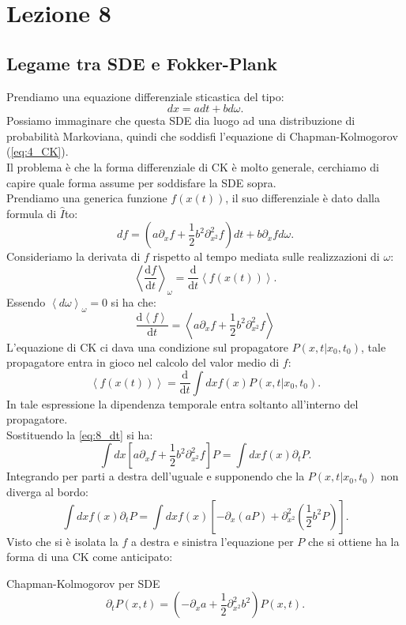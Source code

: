 \section{Lezione 8}%
\label{sub:Lezione 8}
\subsection{Legame tra SDE e Fokker-Plank}%
\label{sub:Legame tra SDE e Fokker-Plank}
Prendiamo una equazione differenziale sticastica del tipo:
\[
    dx = adt + bd\omega
.\] 
Possiamo immaginare che questa SDE dia luogo ad una distribuzione di probabilità Markoviana, quindi che soddisfi l'equazione di Chapman-Kolmogorov (\ref{eq:4_CK}). \\
Il problema è che la forma differenziale di CK è molto generale, cerchiamo di capire quale forma assume per soddisfare la SDE sopra.\\
Prendiamo una generica funzione $f(x(t))$, il suo differenziale è dato dalla formula di $\hat{I}$to:
\[
    df = \left(a\partial_{x}f + \frac{1}{2}b^2\partial^2_{x^2}f\right)dt + b \partial_{x}f d\omega
.\] 
Consideriamo la derivata di $f$ rispetto al tempo mediata sulle realizzazioni di $\omega$:
\[
    \left<\frac{\text{d} f}{\text{d} t} \right>_{\omega} = \frac{\text{d} }{\text{d} t} \left<f(x(t) )\right>
.\] 
Essendo $\left<d\omega\right>_{\omega}=0$ si ha che:
\begin{equation}
    \frac{\text{d} \left<f\right>}{\text{d} t} = \left<a \partial_{x}f +\frac{1}{2}b^2\partial^2_{x^2}f\right>
    \label{eq:8_dt}
\end{equation}
L'equazione di CK ci dava una condizione sul propagatore $P\left(x,t|x_0, t_0\right)$, tale propagatore entra in gioco nel calcolo del valor medio di $f$:
\[
    \left<f(x(t) ) \right> = \frac{\text{d} }{\text{d} t} \int  dx f(x) P\left(x,t|x_0, t_0\right)
.\] 
In tale espressione la dipendenza temporale entra soltanto all'interno del propagatore. \\
Sostituendo la \ref{eq:8_dt} si ha:
\[
    \int dx \left[a \partial_{x}f +\frac{1}{2}b^2\partial^2_{x^2}f\right]P = \int dx f(x) \partial_{t}P 
.\] 
Integrando per parti a destra dell'uguale e supponendo che la $P\left(x,t|x_0,t_0\right)$ non diverga al bordo:
\[
    \int dx f(x) \partial_{t}P = 
\int dx f(x) \left[-\partial_{x}(aP) + \partial^2_{x^2}\left(\frac{1}{2}b^2P\right)\right]
.\] 
Visto che si è isolata la $f$ a destra e sinistra l'equazione per $P$ che si ottiene ha la forma di una CK come anticipato:
\begin{redbox}{Chapman-Kolmogorov per SDE}
\[
    \partial_{t}P(x,t) = \left(-\partial_{x}a + \frac{1}{2}\partial^2_{x^2}b^2\right)P(x,t) 
.\]    
\end{redbox}
